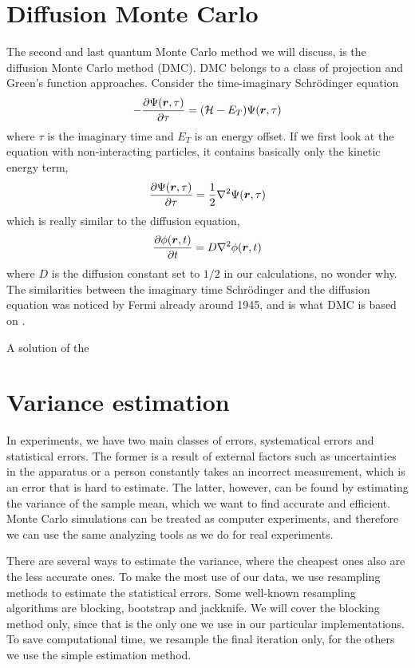 \section{Diffusion Monte Carlo}
The second and last quantum Monte Carlo method we will discuss, is the diffusion Monte Carlo method (DMC). DMC belongs to a class of projection and Green's function approaches. Consider the time-imaginary Schrödinger equation
\begin{eqnarray}
-\frac{\partial\Psi(\boldsymbol{{r}},\tau)}{\partial\tau}=(\mathcal{H}-E_T)\Psi(\boldsymbol{{r}},\tau)
\end{eqnarray}
where $\tau$ is the imaginary time and $E_T$ is an energy offset. If we first look at the equation with non-interacting particles, it contains basically only the kinetic energy term, 
\begin{equation}
\frac{\partial\Psi(\boldsymbol{{r}},\tau)}{\partial\tau}=\frac{1}{2}\nabla^2\Psi(\boldsymbol{{r}},\tau)
\end{equation}
which is really similar to the diffusion equation,
\begin{equation}
\frac{\partial\phi(\boldsymbol{{r}},t)}{\partial t}=D\nabla^2\phi(\boldsymbol{{r}},t)
\end{equation}
where $D$ is the diffusion constant set to $1/2$ in our calculations, no wonder why. The similarities between the imaginary time Schrödinger and the diffusion equation was noticed by Fermi already around 1945, and is what DMC is based on \cite{metropolis_monte_1949,ceperley_quantum_1986}. 

A solution of the 

\section{Variance estimation} \label{sec:variance}
In experiments, we have two main classes of errors, systematical errors and statistical errors. The former is a result of external factors such as uncertainties in the apparatus or a person constantly takes an incorrect measurement, which is an error that is hard to estimate. The latter, however, can be found by estimating the variance of the sample mean, which we want to find accurate and efficient. Monte Carlo simulations can be treated as computer experiments, and therefore we can use the same analyzing tools as we do for real experiments. 

There are several ways to estimate the variance, where the cheapest ones also are the less accurate ones. To make the most use of our data, we use resampling methods to estimate the statistical errors. Some well-known resampling algorithms are blocking, bootstrap and jackknife. We will cover the blocking method only, since that is the only one we use in our particular implementations. To save computational time, we resample the final iteration only, for the others we use the simple estimation method.

